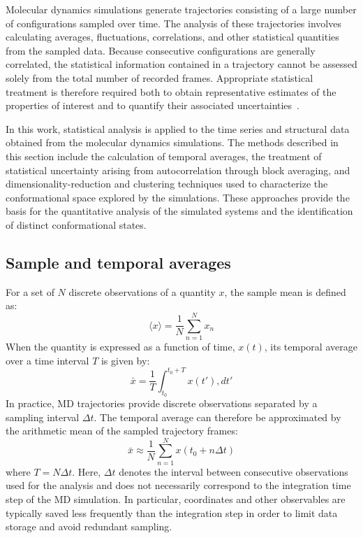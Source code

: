 Molecular dynamics simulations generate trajectories consisting of a large number of configurations sampled over time. The analysis of these trajectories involves calculating averages, fluctuations, correlations, and other statistical quantities from the sampled data. Because consecutive configurations are generally correlated, the statistical information contained in a trajectory cannot be assessed solely from the total number of recorded frames. Appropriate statistical treatment is therefore required both to obtain representative estimates of the properties of interest and to quantify their associated uncertainties~\cite{tratamiento_datos_fisicos}.

In this work, statistical analysis is applied to the time series and structural data obtained from the molecular dynamics simulations. The methods described in this section include the calculation of temporal averages, the treatment of statistical uncertainty arising from autocorrelation through block averaging, and dimensionality-reduction and clustering techniques used to characterize the conformational space explored by the simulations. These approaches provide the basis for the quantitative analysis of the simulated systems and the identification of distinct conformational states.



\subsection{Sample and temporal averages}

For a set of $N$ discrete observations of a quantity $x$, the sample mean is defined as:
\begin{equation}
\langle x \rangle = \frac{1}{N}\sum_{n=1}^{N}x_n
\end{equation}
When the quantity is expressed as a function of time, $x(t)$, its temporal average over a time interval $T$ is given by:
\begin{equation}
\bar{x} =
\frac{1}{T}
\int_{t_0}^{t_0+T} x(t'),dt'
\end{equation}
In practice, MD trajectories provide discrete observations separated by a sampling interval $\Delta t$. The temporal average can therefore be approximated by the arithmetic mean of the sampled trajectory frames:
\begin{equation}
\bar{x}
\approx
\frac{1}{N}
\sum_{n=1}^{N}
x(t_0+n\Delta t)
\end{equation}
where $T=N\Delta t$. Here, $\Delta t$ denotes the interval between consecutive observations used for the analysis and does not necessarily correspond to the integration time step of the MD simulation. In particular, coordinates and other observables are typically saved less frequently than the integration step in order to limit data storage and avoid redundant sampling.


